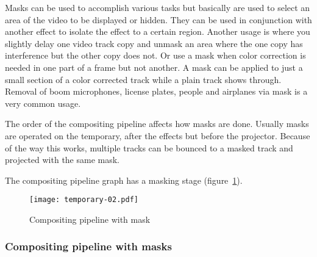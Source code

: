 Masks can be used to accomplish various tasks but basically are used to select an area of the 
video to be displayed or hidden. 
They can be used in conjunction with another effect to isolate the effect to a certain region.
Another usage is where you slightly delay one video track copy and unmask an area where
the one copy has interference but the other copy does not.  Or use a mask when  color correction is
needed in one part of a frame but not another.  A mask can be applied to just a small section of
a color corrected track while a plain track shows through. 
Removal of boom microphones, license plates, people and airplanes via mask is a very common usage.

The order of the compositing pipeline affects how masks are done. Usually masks are operated on the
temporary, after the effects but before the projector. Because of the way this works, multiple
tracks can be bounced to a masked track and projected with the same mask.

The compositing pipeline graph has a masking stage (figure~\ref{fig:temporary-02}).

\begin{figure}[htpb]
    \centering
    \texttt{[image: temporary-02.pdf]}
    \caption{Compositing pipeline with mask}
    \label{fig:temporary-02}
\end{figure}

\subsubsection*{Compositing pipeline with masks}%
\label{ssub:compositing_pipeline_with_masks}

